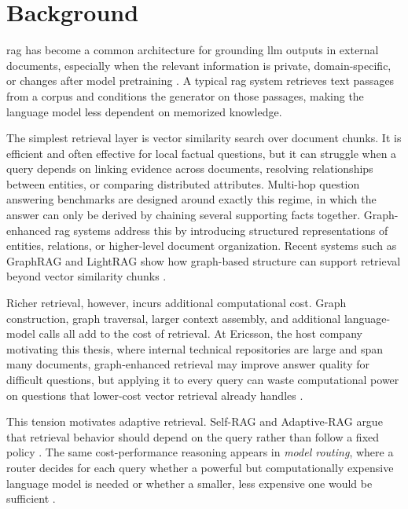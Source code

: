 \documentclass[english, bibtex]{kththesis}               %
\numberwithin{listing}{chapter}
\begin{document}
\section{Background}
\label{sec:background}

\Gls{rag} has become a common architecture for grounding \gls{llm} outputs in external documents, especially when the relevant information is private, domain-specific, or changes after model pretraining \cite{gao2023ragsurvey}. A typical \gls{rag} system retrieves text passages from a corpus and conditions the generator on those passages, making the language model less dependent on memorized knowledge.

The simplest retrieval layer is vector similarity search over document chunks. It is efficient and often effective for local factual questions, but it can struggle when a query depends on linking evidence across documents, resolving relationships between entities, or comparing distributed attributes. Multi-hop question answering benchmarks are designed around exactly this regime, in which the answer can only be derived by chaining several supporting facts together. Graph-enhanced \gls{rag} systems address this by introducing structured representations of entities, relations, or higher-level document organization. Recent systems such as GraphRAG and LightRAG show how graph-based structure can support retrieval beyond vector similarity chunks \cite{edge2024graphrag,lightrag2024}.

Richer retrieval, however, incurs additional computational cost. Graph construction, graph traversal, larger context assembly, and additional language-model calls all add to the cost of retrieval. At Ericsson, the host company motivating this thesis, where internal technical repositories are large and span many documents, graph-enhanced retrieval may improve answer quality for difficult questions, but applying it to every query can waste computational power on questions that lower-cost vector retrieval already handles \cite{jeong2024adaptiverag,hu2024routerbench}.

This tension motivates adaptive retrieval. Self-RAG and Adaptive-RAG argue that retrieval behavior should depend on the query rather than follow a fixed policy \cite{jeong2024adaptiverag,asai2023selfrag}. The same cost-performance reasoning appears in \emph{model routing}, where a router decides for each query whether a powerful but computationally expensive language model is needed or whether a smaller, less expensive one would be sufficient \cite{hu2024routerbench}.
\end{document}
